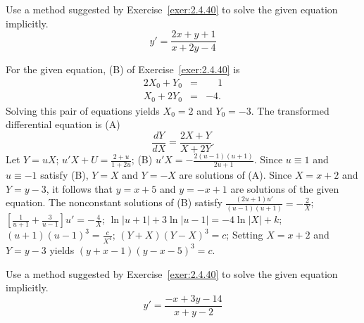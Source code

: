 \documentclass{ximera}
\begin{document}
\begin{problem}\label{exer:2.4.42} Use a method suggested by Exercise~\ref{exer:2.4.40} to solve the
given equation implicitly.
$$y'=\frac{2x+y+1}{x+2y-4}$$



\begin{solution}
    For the given equation, (B)
of Exercise~\ref{exer:2.4.40} is
\begin{eqnarray*}
2X_0+Y_0&=&\phantom{-}1\\
X_0+2Y_0&=&-4.
\end{eqnarray*}
Solving this pair of equations yields   $X_0=2$ and $Y_0=-3$.
The transformed differential equation is (A)
$$
\frac{dY}{ dX}=\frac{2X+Y}{ X+2Y}.
$$
Let $Y=uX$;\;
$u'X+U=\frac{2+u}{1+2u}$;\;
(B) $u'X=-\frac{2(u-1)(u+1)}{ 2u+1}$. Since $u\equiv1$ and
$u\equiv-1$
satisfy (B), $Y=X$ and $Y=-X$ are solutions of (A).
 Since $X=x+2$ and $Y=y-3$, it follows that $y=x+5$
and $y=-x+1$ are solutions of the given equation. The nonconstant
solutions of (B) satisfy
$\frac{(2u+1)u'}{(u-1)(u+1)}=-\frac{2}{ X}$;\;
$\left[\frac{1}{ u+1}+\frac{3}{ u-1}\right]u'=-\frac{4}{
X}$;\;
$\ln|u+1|+3\ln|u-1|=-4\ln|X|+k$;\;
$(u+1)(u-1)^3=\frac{c}{ X^4}$;\;
$(Y+X)(Y-X)^3=c$;\;
Setting $X=x+2$ and $Y=y-3$ yields
$(y+x-1)(y-x-5)^3=c$.

\end{solution}
\end{problem}

\begin{problem}\label{exer:2.4.43} Use a method suggested by Exercise~\ref{exer:2.4.40} to solve the
given equation implicitly.
$$y'=\frac{-x+3y-14}{x+y-2}$$
\end{problem}
\end{document}
